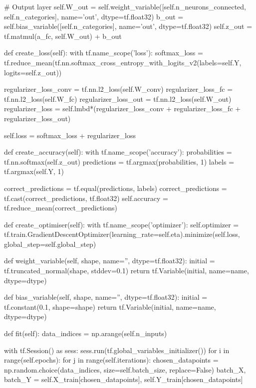 \documentclass[%
oneside,                 %
final,                   %
10pt]{article}
\begin{document}
            # Output layer
            self.W_out = self.weight_variable([self.n_neurons_connected, self.n_categories], name='out', dtype=tf.float32)
            b_out = self.bias_variable([self.n_categories], name='out', dtype=tf.float32)
            self.z_out = tf.matmul(a_fc, self.W_out) + b_out
    
    def create_loss(self):
        with tf.name_scope('loss'):
            softmax_loss = tf.reduce_mean(tf.nn.softmax_cross_entropy_with_logits_v2(labels=self.Y, logits=self.z_out))
            
            regularizer_loss_conv = tf.nn.l2_loss(self.W_conv)
            regularizer_loss_fc = tf.nn.l2_loss(self.W_fc)
            regularizer_loss_out = tf.nn.l2_loss(self.W_out)
            regularizer_loss = self.lmbd*(regularizer_loss_conv + regularizer_loss_fc + regularizer_loss_out)
            
            self.loss = softmax_loss + regularizer_loss

    def create_accuracy(self):
        with tf.name_scope('accuracy'):
            probabilities = tf.nn.softmax(self.z_out)
            predictions = tf.argmax(probabilities, 1)
            labels = tf.argmax(self.Y, 1)
            
            correct_predictions = tf.equal(predictions, labels)
            correct_predictions = tf.cast(correct_predictions, tf.float32)
            self.accuracy = tf.reduce_mean(correct_predictions)
    
    def create_optimiser(self):
        with tf.name_scope('optimizer'):
            self.optimizer = tf.train.GradientDescentOptimizer(learning_rate=self.eta).minimize(self.loss, global_step=self.global_step)
            
    def weight_variable(self, shape, name='', dtype=tf.float32):
        initial = tf.truncated_normal(shape, stddev=0.1)
        return tf.Variable(initial, name=name, dtype=dtype)
    
    def bias_variable(self, shape, name='', dtype=tf.float32):
        initial = tf.constant(0.1, shape=shape)
        return tf.Variable(initial, name=name, dtype=dtype)

    def fit(self):
        data_indices = np.arange(self.n_inputs)

        with tf.Session() as sess:
            sess.run(tf.global_variables_initializer())
            for i in range(self.epochs):
                for j in range(self.iterations):
                    chosen_datapoints = np.random.choice(data_indices, size=self.batch_size, replace=False)
                    batch_X, batch_Y = self.X_train[chosen_datapoints], self.Y_train[chosen_datapoints]
            
\end{document}
